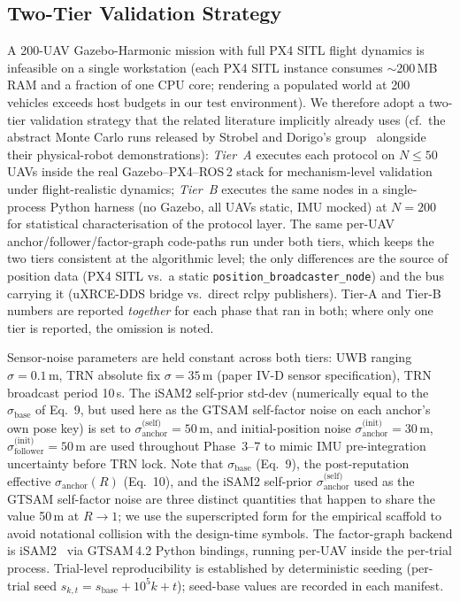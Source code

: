 \documentclass[journal,10pt,twocolumn]{IEEEtran}
\begin{document}
\subsection{Two-Tier Validation Strategy}

A 200-UAV Gazebo-Harmonic mission with full PX4 SITL flight dynamics is infeasible on a single workstation (each PX4 SITL instance consumes $\sim$200\,MB RAM and a fraction of one CPU core; rendering a populated world at 200 vehicles exceeds host budgets in our test environment). We therefore adopt a two-tier validation strategy that the related literature implicitly already uses (cf.~the abstract Monte Carlo runs released by Strobel and Dorigo's group~\cite{strobel2020blockchain,strobel2023robot} alongside their physical-robot demonstrations): \emph{Tier~A} executes each protocol on $N \leq 50$ UAVs inside the real Gazebo--PX4--ROS\,2 stack for mechanism-level validation under flight-realistic dynamics; \emph{Tier~B} executes the same nodes in a single-process Python harness (no Gazebo, all UAVs static, IMU mocked) at $N=200$ for statistical characterisation of the protocol layer. The same per-UAV anchor/follower/factor-graph code-paths run under both tiers, which keeps the two tiers consistent at the algorithmic level; the only differences are the source of position data (PX4 SITL vs.\ a static \texttt{position\_broadcaster\_node}) and the bus carrying it (uXRCE-DDS bridge vs.\ direct rclpy publishers). Tier-A and Tier-B numbers are reported \emph{together} for each phase that ran in both; where only one tier is reported, the omission is noted.

Sensor-noise parameters are held constant across both tiers: UWB ranging $\sigma=0.1$\,m, TRN absolute fix $\sigma=35$\,m (paper IV-D sensor specification), TRN broadcast period 10\,s. The iSAM2 self-prior std-dev (numerically equal to the $\sigma_\text{base}$ of Eq.~9, but used here as the GTSAM self-factor noise on each anchor's own pose key) is set to $\sigma^{\text{(self)}}_\text{anchor}=50$\,m, and initial-position noise $\sigma^{\text{(init)}}_\text{anchor}=30$\,m, $\sigma^{\text{(init)}}_\text{follower}=50$\,m are used throughout Phase~3--7 to mimic IMU pre-integration uncertainty before TRN lock. Note that $\sigma_\text{base}$ (Eq.~9), the post-reputation effective $\sigma_\text{anchor}(R)$ (Eq.~10), and the iSAM2 self-prior $\sigma^{\text{(self)}}_\text{anchor}$ used as the GTSAM self-factor noise are three distinct quantities that happen to share the value 50\,m at $R\!\to\!1$; we use the superscripted form for the empirical scaffold to avoid notational collision with the design-time symbols. The factor-graph backend is iSAM2~\cite{kaess2012isam2} via GTSAM\,4.2 Python bindings, running per-UAV inside the per-trial process. Trial-level reproducibility is established by deterministic seeding (per-trial seed $s_{k,t} = s_\text{base} + 10^5 k + t$); seed-base values are recorded in each manifest.
\end{document}
